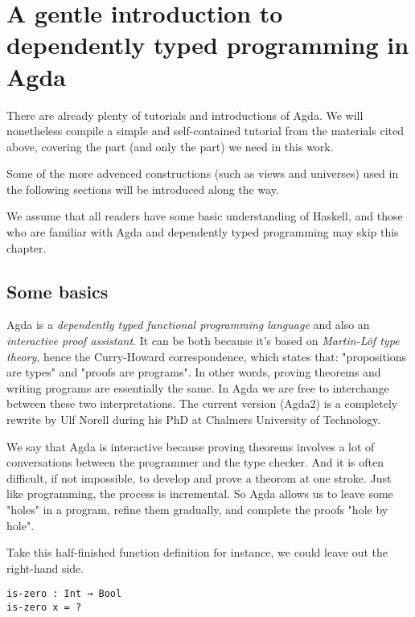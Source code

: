 \documentclass[../thesis.tex]{subfiles}
\begin{document}
\chapter{A gentle introduction to dependently typed programming in Agda}\label{agda}

There are already plenty of tutorials and introductions of Agda\cite{norell2009dependently}\cite{FLOLAC16DTP}\cite{brutal}.
We will nonetheless compile a simple and self-contained tutorial from the
materials cited above, covering the part (and only the part) we need in this work.

Some of the more advenced  constructions (such as views and universes) used in
the following sections will be introduced along the way.

We assume that all readers have some basic understanding of Haskell, and those
who are familiar with Agda and dependently typed programming may skip this chapter.

\section{Some basics}

Agda is a \textit{dependently typed functional programming language} and also an
\textit{interactive proof assistant}. It can be both because it's based on
\textit{Martin-Löf type theory}\cite{martin1984intuitionistic}, hence the Curry-Howard
correspondence\cite{sorensen2006lectures}, which states that: "propositions are types"
and "proofs are programs". In other words, proving theorems and writing programs
are essentially the same. In Agda we are free to interchange between these two
interpretations. The current version (Agda2) is a completely rewrite by Ulf Norell
during his PhD at Chalmers University of Technology.

We say that Agda is interactive because proving
theorems involves a lot of conversations between the programmer and the type checker.
And it is often difficult, if not impossible, to develop and prove a theorom  at one stroke.
Just like programming, the process is incremental.
So Agda allows us to leave some "holes"  in a program, refine them gradually, and
complete the proofs "hole by hole".

Take this half-finished function definition for instance, we could leave out the
right-hand side.

\begin{lstlisting}
is-zero : Int → Bool
is-zero x = ?
\end{lstlisting}
\end{document}
